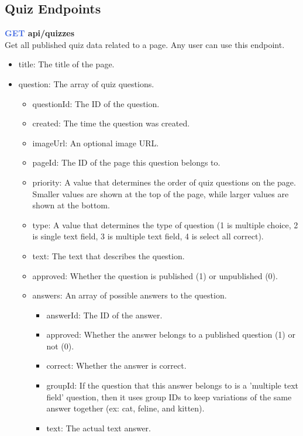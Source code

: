 \documentclass[onecolumn, draftclsnofoot,10pt, compsoc, usenames, dvipsnames]{IEEEtran}
\begin{document}
\subsection{Quiz Endpoints}


\noindent
\textbf{\textcolor{RoyalBlue}{GET} api/quizzes} \\
Get all published quiz data related to a page. Any user can use this endpoint.
\begin{itemize}
    \item title: The title of the page.
    \item question: The array of quiz questions.
    \begin{itemize}
        \item questionId: The ID of the question.
        \item created: The time the question was created.
        \item imageUrl: An optional image URL.
        \item pageId: The ID of the page this question belongs to.
        \item priority: A value that determines the order of quiz questions on the page. Smaller values are shown at the top of the page, while larger values are shown at the bottom.
        \item type: A value that determines the type of question (1 is multiple choice, 2 is single text field, 3 is multiple text field, 4 is select all correct).
        \item text: The text that describes the question.
        \item approved: Whether the question is published (1) or unpublished (0).
        \item answers: An array of possible answers to the question.
            \begin{itemize}
              \item answerId: The ID of the answer.
              \item approved: Whether the answer belongs to a published question (1) or not (0).
              \item correct: Whether the answer is correct.
              \item groupId: If the question that this answer belongs to is a 'multiple text field' question, then it uses group IDs to keep variations of the same answer together (ex: cat, feline, and kitten).
              \item text: The actual text answer.
            \end{itemize}
    \end{itemize}
\end{itemize}
\end{document}
